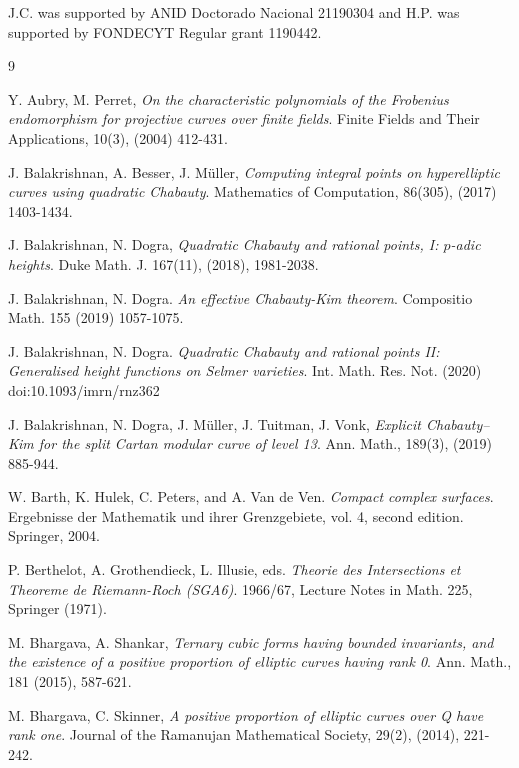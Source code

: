 \documentclass[11pt]{amsart}
\theoremstyle{remark}
\numberwithin{equation}{section}
\begin{document}
J.C. was supported by ANID Doctorado Nacional 21190304 and H.P. was supported by FONDECYT Regular grant 1190442.
%
%
%



\begin{thebibliography}{9}      

 Y. Aubry, M. Perret, \emph{On the characteristic polynomials of the Frobenius endomorphism for projective curves over finite fields}. Finite Fields and Their Applications, 10(3), (2004) 412-431.



 J. Balakrishnan, A. Besser, J. M\"uller,  \emph{Computing integral points on hyperelliptic curves using quadratic Chabauty}. Mathematics of Computation, 86(305), (2017) 1403-1434.

 J. Balakrishnan, N. Dogra, \emph{Quadratic Chabauty and rational points, I: $p$-adic heights}. Duke Math. J. 167(11), (2018), 1981-2038.

 J. Balakrishnan, N. Dogra. \emph{An effective Chabauty-Kim theorem}. Compositio Math. 155 (2019) 1057-1075.


 J. Balakrishnan, N. Dogra. \emph{Quadratic Chabauty and rational points II: Generalised height functions on Selmer varieties}. Int. Math. Res. Not. (2020) doi:10.1093/imrn/rnz362


 J. Balakrishnan, N. Dogra, J. M\"uller, J. Tuitman, J. Vonk, \emph{Explicit Chabauty--Kim for the split Cartan modular curve of level 13}. Ann. Math., 189(3), (2019) 885-944.

 W. Barth,  K. Hulek,  C. Peters,  and  A. Van  de  Ven. \emph{Compact complex surfaces}. Ergebnisse der Mathematik und ihrer Grenzgebiete, vol. 4, second edition.  Springer, 2004.


 P. Berthelot, A. Grothendieck, L. Illusie, eds. \emph{Theorie des Intersections et Theoreme de Riemann-Roch (SGA6)}. 1966/67, Lecture Notes in Math. 225, Springer (1971).
%

 M. Bhargava, A. Shankar, \emph{Ternary cubic forms having bounded invariants, and the existence of a positive proportion of elliptic curves having rank 0}. Ann. Math., 181 (2015), 587-621.

 M. Bhargava, C. Skinner, \emph{A positive proportion of elliptic curves over Q have rank one}. Journal of the Ramanujan Mathematical Society, 29(2), (2014), 221-242.




\end{thebibliography}
\end{document}
